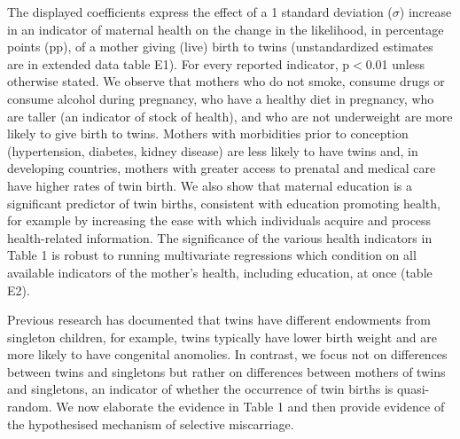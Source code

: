\documentclass{nature}
\begin{document}
\begin{linenumbers}
The displayed coefficients express the effect of a 1 standard deviation ($\sigma$) increase in an indicator of maternal health on the change in the likelihood, in percentage points (pp), of a mother giving (live) birth to twins (unstandardized estimates are in extended data table E1). For every reported indicator, p$<$0.01 unless otherwise stated. %
We observe that mothers who do not smoke, consume drugs or consume alcohol during pregnancy, who have a healthy diet in pregnancy, who are taller (an indicator of stock of health\cite{Silventoinen2003,BhalotraRawlings2013}), and who are not underweight are more likely to give birth to twins. Mothers with morbidities prior to conception (hypertension, diabetes, kidney disease) are less likely to have twins and, in developing countries, mothers with greater access to prenatal and medical care have higher rates of twin birth. We also show that maternal education is  a significant predictor of twin births, consistent with education promoting health, for example by increasing the ease with which individuals acquire and process health-related information\cite{Kenkel1991,CutlerLlerasMuney2010}. %
The significance of the various health indicators in Table 1 is robust to running multivariate regressions which condition on all available indicators of the mother's health, including education, at once (table E2). 

Previous research has documented that twins have different endowments from singleton children, for example, twins typically have lower birth weight and are more likely to have congenital anomolies\cite{Hall2003}. In contrast, we focus not on differences between twins and singletons but rather on differences between mothers of twins and singletons, an indicator of whether the occurrence of twin births is quasi-random. We now elaborate the evidence in Table 1 and then provide evidence of the hypothesised mechanism of selective miscarriage.



\end{linenumbers}
\end{document}
